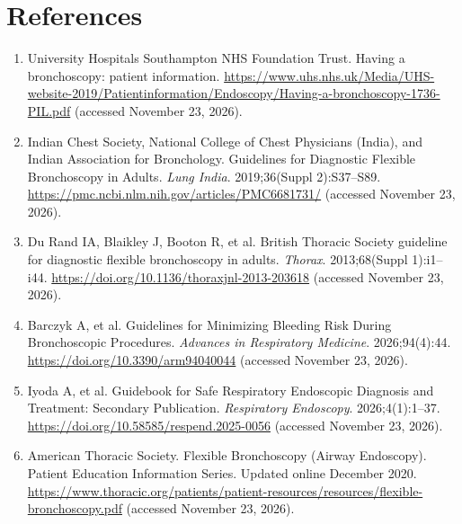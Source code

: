 \section*{References}
\begin{enumerate}
  \item University Hospitals Southampton NHS Foundation Trust. Having a bronchoscopy: patient information. \url{https://www.uhs.nhs.uk/Media/UHS-website-2019/Patientinformation/Endoscopy/Having-a-bronchoscopy-1736-PIL.pdf} (accessed November 23, 2026).
  \item Indian Chest Society, National College of Chest Physicians (India), and Indian Association for Bronchology. Guidelines for Diagnostic Flexible Bronchoscopy in Adults. \textit{Lung India}. 2019;36(Suppl 2):S37--S89. \url{https://pmc.ncbi.nlm.nih.gov/articles/PMC6681731/} (accessed November 23, 2026).
  \item Du Rand IA, Blaikley J, Booton R, et al. British Thoracic Society guideline for diagnostic flexible bronchoscopy in adults. \textit{Thorax}. 2013;68(Suppl 1):i1--i44. \url{https://doi.org/10.1136/thoraxjnl-2013-203618} (accessed November 23, 2026).
  \item Barczyk A, et al. Guidelines for Minimizing Bleeding Risk During Bronchoscopic Procedures. \textit{Advances in Respiratory Medicine}. 2026;94(4):44. \url{https://doi.org/10.3390/arm94040044} (accessed November 23, 2026).
  \item Iyoda A, et al. Guidebook for Safe Respiratory Endoscopic Diagnosis and Treatment: Secondary Publication. \textit{Respiratory Endoscopy}. 2026;4(1):1--37. \url{https://doi.org/10.58585/respend.2025-0056} (accessed November 23, 2026).
  \item American Thoracic Society. Flexible Bronchoscopy (Airway Endoscopy). Patient Education Information Series. Updated online December 2020. \url{https://www.thoracic.org/patients/patient-resources/resources/flexible-bronchoscopy.pdf} (accessed November 23, 2026).
\end{enumerate}

\clearpage
